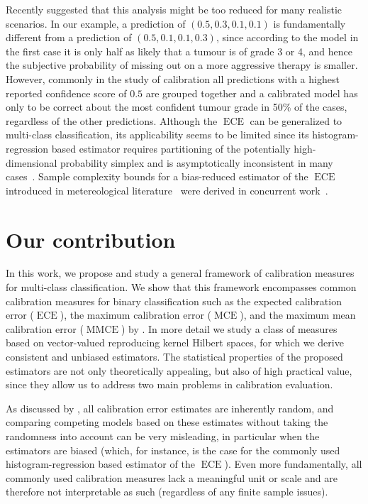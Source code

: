 \documentclass{article}
\DeclareMathOperator{\ECE}{ECE}
\DeclareMathOperator{\MCE}{MCE}
\DeclareMathOperator{\MMCE}{MMCE}
\begin{document}
Recently \citet{vaicenavicius19_evaluat} suggested that this analysis might
be too reduced for many realistic scenarios. In our example, a prediction of
$(0.5, 0.3, 0.1, 0.1)$ is fundamentally different from a prediction of
$(0.5, 0.1, 0.1, 0.3)$, since according to the model in the first case it is only
half as likely that a tumour is of grade 3 or 4, and hence the subjective
probability of missing out on a more aggressive therapy is smaller. However,
commonly in the study of calibration all predictions with a highest reported
confidence score of $0.5$ are grouped together and a calibrated model has only to
be correct about the most confident tumour grade in 50\% of the cases, regardless
of the other predictions. Although the $\ECE$ can be generalized to multi-class
classification, its applicability seems to be limited since its
histogram-regression based estimator requires partitioning of the potentially
high-dimensional probability simplex and is asymptotically inconsistent in many
cases~\citep{vaicenavicius19_evaluat}. Sample complexity bounds for a
bias-reduced estimator of the $\ECE$ introduced in metereological
literature~\citep{ferro12_bias_correc_decom_brier_score,broecker11_estim_reliab_resol_probab_forec}
were derived in concurrent work~\citep{kumar19_verif_uncer_calib}.

\section{Our contribution}

In this work, we propose and study a general framework of calibration measures
for multi-class classification. We show that this framework encompasses common
calibration measures for binary classification such as the expected calibration
error ($\ECE$), the maximum calibration error ($\MCE$), and the maximum mean
calibration error ($\MMCE$) by \citet{kumar18_train_calib_measur_neural_networ}. In
more detail we study a class of measures based on vector-valued reproducing
kernel Hilbert spaces, for which we derive consistent and unbiased estimators.
The statistical properties of the proposed estimators are not only theoretically
appealing, but also of high practical value, since they allow us to address two
main problems in calibration evaluation.

As discussed by \citet{vaicenavicius19_evaluat}, all calibration error
estimates are inherently random, and comparing competing models based on these
estimates without taking the randomness into account can be very misleading, in
particular when the estimators are biased (which, for instance, is the case for
the commonly used histogram-regression based estimator of the $\ECE$). Even more
fundamentally, all commonly used calibration measures lack a meaningful unit or
scale and are therefore not interpretable as such (regardless of any finite
sample issues).
\end{document}
